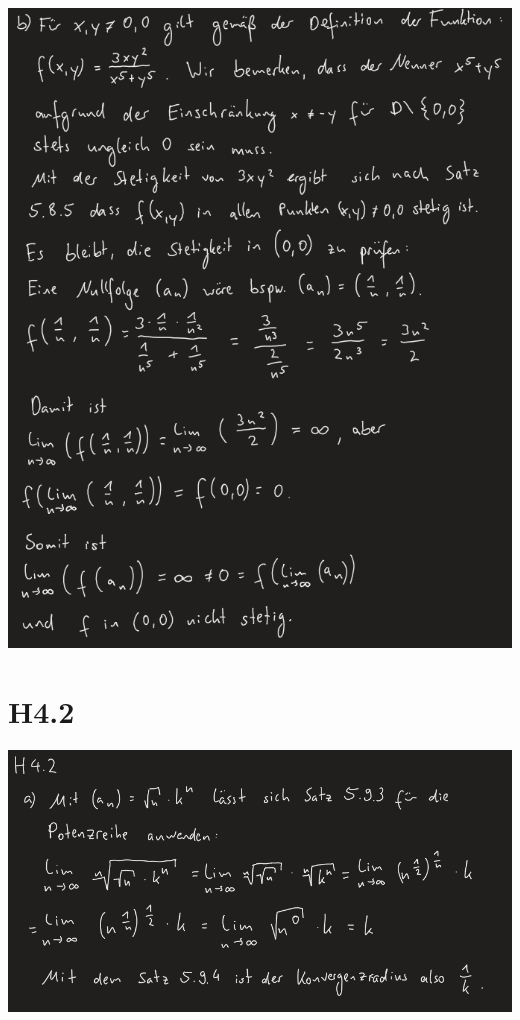 \documentclass{article}
\begin{document}
\includegraphics[scale=0.7]{ h4_1b } 
\newpage

\section{H4.2}
\includegraphics[scale=0.6]{ h4_2a }
\bigskip
\end{document}
